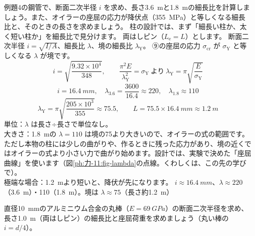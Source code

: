 \begin{phreidai}[細長比の境]
\label{ph:力-11:ex5}例題4の鋼管で、断面二次半径 $i$ を求め、長さ\qty{3.6}{m}と\qty{1.8}{m}の細長比を計算しましょう。また、オイラーの座屈の応力が降伏点（\qty{355}{MPa}）と等しくなる細長比と、そのときの長さを求めましょう。
\phbamen
柱の設計では、まず「細長い柱か、太く短い柱か」を細長比で見分けます。
\phmushi
両はしピン（$L_{\mathrm e}=L$）とします。
\phzu
断面二次半径 $i=\sqrt{I/A}$、細長比 $\lambda$、境の細長比 $\lambda_{\mathrm Y}$。
\phriyu
⑨の座屈の応力 $\sigma_{\mathrm{cr}}$ が $\sigma_{\mathrm Y}$ と等しくなる $\lambda$ が境です。
\phtateru
\[ i=\sqrt{\frac{9.32\times10^4}{348}},\qquad \frac{\pi^2E}{\lambda_{\mathrm Y}^2}=\sigma_{\mathrm Y}\ \text{より}\ \lambda_{\mathrm Y}=\pi\sqrt{\frac{E}{\sigma_{\mathrm Y}}} \]
\phtoku
\[ i=\qty{16.4}{mm},\quad \lambda_{3.6}=\frac{3600}{16.4}\approx220,\quad \lambda_{1.8}\approx110 \]
\[ \lambda_{\mathrm Y}=\pi\sqrt{\frac{205\times10^3}{355}}\approx75.5,\qquad L=75.5\times\qty{16.4}{mm}\approx\qty{1.2}{m} \]
\phtashikame
単位：$\lambda$ は長さ÷長さで単位なし。\\
大きさ：\qty{1.8}{m}の $\lambda=110$ は境の75より大きいので、オイラーの式の範囲です。ただし本物の柱には少しの曲がりや、作るときに残った応力があり、境の近くではオイラーの式より小さい力で曲がり始めます。設計では、実験で決めた「座屈曲線」を使います（図\ref{ph:力-11:fig-lambda}の点線。くわしくは、この先の学びで）。\\
極端な場合：\qty{1.2}{m}より短いと、降伏が先になります。
\kotae $i\approx\qty{16.4}{mm}$、$\lambda\approx220$（\qty{3.6}{m}）・110（\qty{1.8}{m}）。境は $\lambda\approx75$（長さ約\qty{1.2}{m}）
\end{phreidai}
\begin{jibun}
直径\qty{10}{mm}のアルミニウム合金の丸棒（$E=\qty{69}{GPa}$）の断面二次半径を求め、長さ\qty{1.0}{m}（両はしピン）の細長比と座屈荷重を求めましょう（丸い棒の $i=d/4$）。
\end{jibun}

